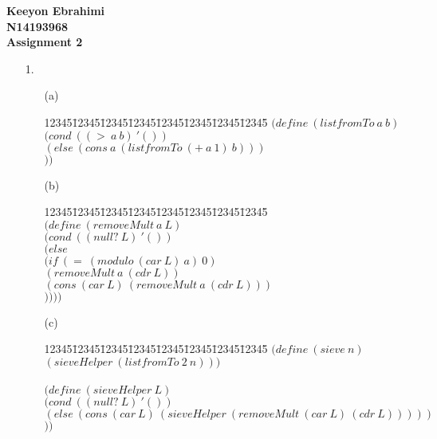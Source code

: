 \documentclass[11pt]{article}
\newenvironment{code}{\begin{tabbing}
12345\=12345\=12345\=12345\=12345\=12345\=12345\=12345\= \kill }
{\end{tabbing}}
\begin{document}
\textbf{Keeyon Ebrahimi}\\
\textbf{N14193968}\\
\textbf{Assignment 2}\\

\begin{enumerate}
\item[1. ]

\begin{enumerate}
\item[(a)] 
\begin{code}
$(define\ (listfromTo\ a\ b)$\\
\> $(cond\ ((>\ a\ b)\ '())$\\
\> \> $(else\ (cons\ a\ (listfromTo\ (+\ a\ 1)\ b)))$\\
\> \> $))$ \\
\end{code}

\item[(b)]

\begin{code}
$(define\ (removeMult\ a\ L)$\\
\> $(cond\ ((null?\ L)\ '())$\\
\> \> $(else\ $\\
\> \> \> $(if\ (=\ (modulo\ (car\ L)\ a)\ 0)$\\
\> \> \> \> $(removeMult\ a\ (cdr\ L))$\\
\> \> \> \> $(cons\ (car\ L)\ (removeMult\ a\ (cdr\ L)))$\\
\> \> \> \> $))))$\\
\end{code}

\item[(c)]

\begin{code}
$(define\ (sieve\ n)$ \\
\> $(sieveHelper\ (listfromTo\ 2\ n)))$ \\ \\
$(define\ (sieveHelper\ L)$\\
\> $(cond\ ((null?\ L)\ '())$ \\
\> \> $(else\ (cons\ (car\ L)\ (sieveHelper\ (removeMult\ (car\ L)\ (cdr\ L)))))$\\
\> \> $))$\\
\end{code}
\end{enumerate}
\end{enumerate}
\end{document}
